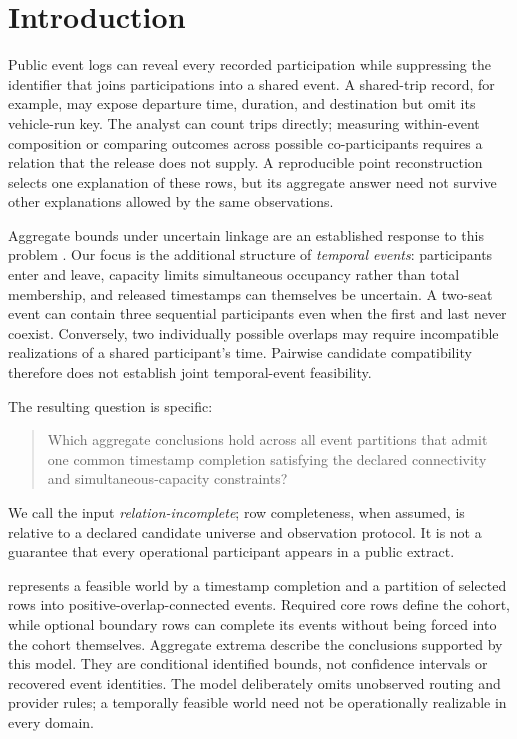 \section{Introduction}

Public event logs can reveal every recorded participation while suppressing
the identifier that joins participations into a shared event. A shared-trip
record, for example, may expose departure time, duration, and destination but
omit its vehicle-run key. The analyst can count trips directly; measuring
within-event composition or comparing outcomes across possible co-participants
requires a relation that the release does not supply. A reproducible point
reconstruction selects one explanation of these rows, but its aggregate answer
need not survive other explanations allowed by the same observations.

Aggregate bounds under uncertain linkage are an established response to this
problem \citep{turkcapar2023aggregate,hua2012aggregate}. Our focus is the
additional structure of \emph{temporal events}: participants enter and leave,
capacity limits simultaneous occupancy rather than total membership, and
released timestamps can themselves be uncertain. A two-seat event can contain
three sequential participants even when the first and last never coexist.
Conversely, two individually possible overlaps may require incompatible
realizations of a shared participant's time. Pairwise candidate compatibility
therefore does not establish joint temporal-event feasibility.

The resulting question is specific:
\begin{quote}
Which aggregate conclusions hold across all event partitions that admit one
common timestamp completion satisfying the declared connectivity and
simultaneous-capacity constraints?
\end{quote}
We call the input \emph{relation-incomplete}; row completeness, when assumed,
is relative to a declared candidate universe and observation protocol. It is
not a guarantee that every operational participant appears in a public extract.

\methodname{} represents a feasible world by a timestamp completion and a
partition of selected rows into positive-overlap-connected events. Required
core rows define the cohort, while optional boundary rows can complete its
events without being forced into the cohort themselves. Aggregate extrema
describe the conclusions supported by this model. They are conditional
identified bounds, not confidence intervals or recovered event identities.
The model deliberately omits unobserved routing and provider rules; a
temporally feasible world need not be operationally realizable in every domain.


